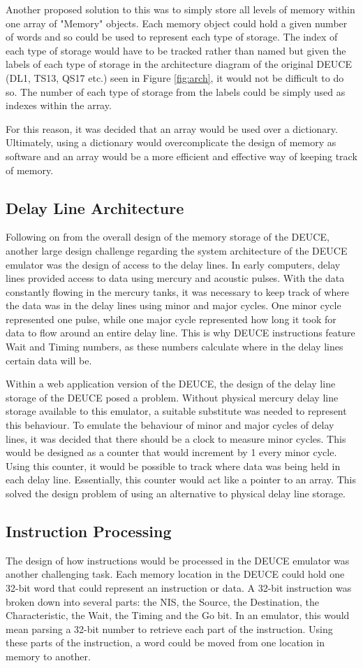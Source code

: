 \documentclass{l4proj}
\begin{document}
Another proposed solution to this was to simply store all levels of memory within one array of "Memory" objects. Each memory object could hold a given number of words and so could be used to represent each type of storage. The index of each type of storage would have to be tracked rather than named but given the labels of each type of storage in the architecture diagram of the original DEUCE (DL1, TS13, QS17 etc.) seen in Figure \ref{fig:arch}, it would not be difficult to do so. The number of each type of storage from the labels could be simply used as indexes within the array.

For this reason, it was decided that an array would be used over a dictionary. Ultimately, using a dictionary would overcomplicate the design of memory as software and an array would be a more efficient and effective way of keeping track of memory.
\subsection{Delay Line Architecture}
Following on from the overall design of the memory storage of the DEUCE, another large design challenge regarding the system architecture of the DEUCE emulator was the design of access to the delay lines. In early computers, delay lines provided access to data using mercury and acoustic pulses. With the data constantly flowing in the mercury tanks, it was necessary to keep track of where the data was in the delay lines using minor and major cycles. One minor cycle represented one pulse, while one major cycle represented how long it took for data to flow around an entire delay line. This is why DEUCE instructions feature Wait and Timing numbers, as these numbers calculate where in the delay lines certain data will be.

Within a web application version of the DEUCE, the design of the delay line storage of the DEUCE posed a problem. Without physical mercury delay line storage available to this emulator, a suitable substitute was needed to represent this behaviour. To emulate the behaviour of minor and major cycles of delay lines, it was decided that there should be a clock to measure minor cycles. This would be designed as a counter that would increment by 1 every minor cycle. Using this counter, it would be possible to track where data was being held in each delay line. Essentially, this counter would act like a pointer to an array. This solved the design problem of using an alternative to physical delay line storage.

\subsection{Instruction Processing}
The design of how instructions would be processed in the DEUCE emulator was another challenging task. Each memory location in the DEUCE could hold one 32-bit word that could represent an instruction or data. A 32-bit instruction was broken down into several parts: the NIS, the Source, the Destination, the Characteristic, the Wait, the Timing and the Go bit. In an emulator, this would mean parsing a 32-bit number to retrieve each part of the instruction. Using these parts of the instruction, a word could be moved from one location in memory to another. 
\end{document}
